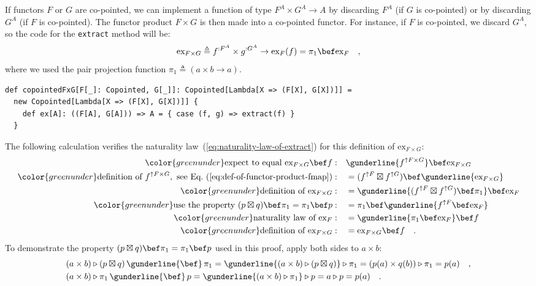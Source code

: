 If functors $F$ or $G$ are co-pointed, we can implement a function
of type $F^{A}\times G^{A}\rightarrow A$ by discarding $F^{A}$ (if
$G$ is co-pointed) or by discarding $G^{A}$ (if $F$ is co-pointed).
The functor product $F\times G$ is then made into a co-pointed functor.
For instance, if $F$ is co-pointed, we discard $G^{A}$, so the code
for the \lstinline!extract! method will be:
\[
\text{ex}_{F\times G}\triangleq f^{:F^{A}}\times g^{:G^{A}}\rightarrow\text{ex}_{F}(f)=\pi_{1}\bef\text{ex}_{F}\quad,
\]
where we used the pair projection function $\pi_{1}\triangleq(a\times b\rightarrow a)$.
\begin{lstlisting}
def copointedFxG[F[_]: Copointed, G[_]]: Copointed[Lambda[X => (F[X], G[X])]] =
  new Copointed[Lambda[X => (F[X], G[X])]] {
    def ex[A]: ((F[A], G[A])) => A = { case (f, g) => extract(f) }
  }
\end{lstlisting}
The following calculation verifies the naturality law~(\ref{eq:naturality-law-of-extract})
for this definition of $\text{ex}_{F\times G}$:
\begin{align*}
{\color{greenunder}\text{expect to equal }\text{ex}_{F\times G}\bef f:}\quad & \gunderline{f^{\uparrow F\times G}}\bef\text{ex}_{F\times G}\\
{\color{greenunder}\text{definition of }f^{\uparrow F\times G},\text{ see Eq.~(\ref{eq:def-of-functor-product-fmap})}:}\quad & =(f^{\uparrow F}\boxtimes f^{\uparrow G})\bef\gunderline{\text{ex}_{F\times G}}\\
{\color{greenunder}\text{definition of }\text{ex}_{F\times G}:}\quad & =\gunderline{(f^{\uparrow F}\boxtimes f^{\uparrow G})\bef\pi_{1}}\bef\text{ex}_{F}\\
{\color{greenunder}\text{use the property }(p\boxtimes q)\bef\pi_{1}=\pi_{1}\bef p:}\quad & =\pi_{1}\bef\gunderline{f^{\uparrow F}\bef\text{ex}_{F}}\\
{\color{greenunder}\text{naturality law of }\text{ex}_{F}:}\quad & =\gunderline{\pi_{1}\bef\text{ex}_{F}}\bef f\\
{\color{greenunder}\text{definition of }\text{ex}_{F\times G}:}\quad & =\text{ex}_{F\times G}\bef f\quad.
\end{align*}
To demonstrate the property $(p\boxtimes q)\bef\pi_{1}=\pi_{1}\bef p$
used in this proof, apply both sides to $a\times b$:
\begin{align*}
 & (a\times b)\triangleright(p\boxtimes q)\,\gunderline{\bef}\,\pi_{1}=\gunderline{(a\times b)\triangleright(p\boxtimes q)}\triangleright\pi_{1}=(p(a)\times q(b))\triangleright\pi_{1}=p(a)\quad,\\
 & (a\times b)\triangleright\pi_{1}\,\gunderline{\bef}\,p=\gunderline{(a\times b)\triangleright\pi_{1}}\triangleright p=a\triangleright p=p(a)\quad.
\end{align*}



